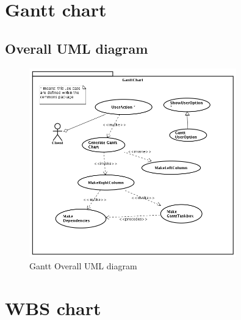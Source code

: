 \documentclass[a4paper, 12pt]{report}
\begin{document}













\chapter{Gantt chart}
\section*{Overall UML diagram}
\begin{figure}[h!] \centering
\includegraphics[width=0.8\textwidth]{Gantt/img/GanttChart.png} 
\caption{Gantt Overall UML diagram}
\label{fig:ganttDiagram}
\end{figure}






\chapter{WBS chart}
\end{document}
